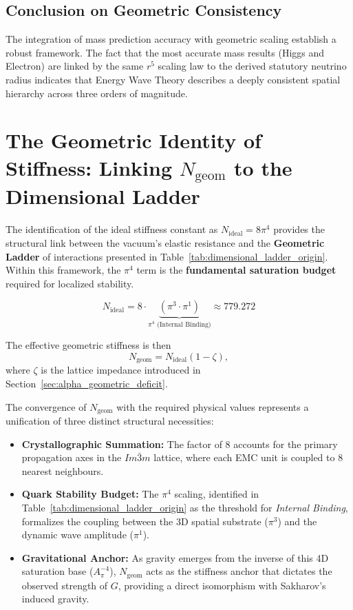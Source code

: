 \documentclass[10pt,a4paper]{article}
\begin{document}
\subsection{Conclusion on Geometric Consistency}
The integration of mass prediction accuracy with geometric scaling establish a robust framework. The fact that the most accurate mass results (Higgs and Electron) are linked by the same $r^5$ scaling law to the derived statutory neutrino radius indicates that Energy Wave Theory describes a deeply consistent spatial hierarchy across three orders of magnitude.

\section{The Geometric Identity of Stiffness: Linking \(N_{\text{geom}}\) to the Dimensional Ladder}

The identification of the ideal stiffness constant as \(N_{\text{ideal}} = 8\pi^4\) provides the structural link between the vacuum's elastic resistance and the \textbf{Geometric Ladder} of interactions presented in Table~\ref{tab:dimensional_ladder_origin}. Within this framework, the \(\pi^4\) term is the \textbf{fundamental saturation budget} required for localized stability.

\begin{equation}
	N_{\text{ideal}} = 8 \cdot \underbrace{(\pi^3 \cdot \pi^1)}_{\pi^4 \text{ (Internal Binding)}} \approx 779.272
\end{equation}

The effective geometric stiffness is then
\begin{equation}
	N_{\text{geom}} = N_{\text{ideal}}(1-\zeta),
	\label{eq:N_geom_stiffness}
\end{equation}
where \(\zeta\) is the lattice impedance introduced in Section~\ref{sec:alpha_geometric_deficit}.

The convergence of \(N_{\text{geom}}\) with the required physical values represents a unification of three distinct structural necessities:
\begin{itemize}
	\item \textbf{Crystallographic Summation:} The factor of \(8\) accounts for the primary propagation axes in the \(Im\bar{3}m\) lattice, where each EMC unit is coupled to 8 nearest neighbours.
	\item \textbf{Quark Stability Budget:} The \(\pi^4\) scaling, identified in Table~\ref{tab:dimensional_ladder_origin} as the threshold for \textit{Internal Binding}, formalizes the coupling between the 3D spatial substrate (\(\pi^3\)) and the dynamic wave amplitude (\(\pi^1\)).
	\item \textbf{Gravitational Anchor:} As gravity emerges from the inverse of this 4D saturation base (\(A_{\pi}^{-4}\)), \(N_{\text{geom}}\) acts as the stiffness anchor that dictates the observed strength of \(G\), providing a direct isomorphism with Sakharov's induced gravity.
\end{itemize}
\end{document}
